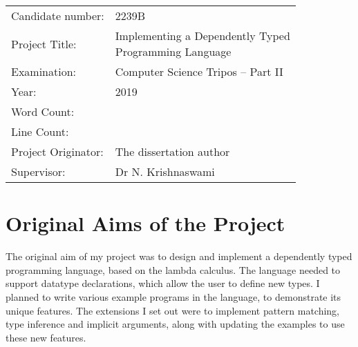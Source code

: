 \documentclass[12pt,a4paper,twoside]{report}
\begin{document}
{\large
    \begin{tabular}{ll}
        Candidate number:   & 2239B                                                                                                                                                                        \\
        Project Title:      & \makecell[lt]{Implementing a Dependently Typed                                                                                                                               \\ Programming Language} \\
        Examination:        & Computer Science Tripos -- Part II                                                                                                                                           \\
        Year:               & 2019                                                                                                                                                                         \\
        Word Count:         &                                                                                                                                          \\
        Line Count:         &  \\
        Project Originator: & The dissertation author                                                                                                                                                   \\
        Supervisor:         & Dr N. Krishnaswami                                                                                                                                                           \\
    \end{tabular}
}

\section*{Original Aims of the Project}

The original aim of my project was to design and implement a dependently typed programming language, based on the lambda calculus.
The language needed to support datatype declarations, which allow the user to define new types.
I planned to write various example programs in the language, to demonstrate its unique features.
The extensions I set out were to implement pattern matching, type inference and implicit arguments, along with updating the examples to use these new features.
\end{document}
